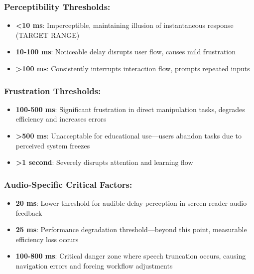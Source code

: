 \subsubsection{Perceptibility Thresholds:}

\begin{itemize}
	\item \textbf{<10 ms}: Imperceptible, maintaining illusion of instantaneous response (TARGET RANGE) \supercite{Nielsen1993UsabilityEngineering}
	\item \textbf{10-100 ms}: Noticeable delay disrupts user flow, causes mild frustration \supercite{Miller1968ReactionTime}
	\item \textbf{>100 ms}: Consistently interrupts interaction flow, prompts repeated inputs \supercite{Shneiderman1998DesigningTheUserInterface}
\end{itemize}


\subsubsection{Frustration Thresholds:}

\begin{itemize}
	\item \textbf{100-500 ms}: Significant frustration in direct manipulation tasks, degrades efficiency and increases errors \supercite{Card1983ThePsychologyOfHumanComputerInteraction}
	\item \textbf{>500 ms}: Unacceptable for educational use—users abandon tasks due to perceived system freezes \supercite{Sears1993TheEffectOfResponseTime}
	\item \textbf{>1 second}: Severely disrupts attention and learning flow \supercite{Dix2004HumanComputerInteraction}
\end{itemize}


\subsubsection{Audio-Specific Critical Factors:}

\begin{itemize}
	\item \textbf{20 ms}: Lower threshold for audible delay perception in screen reader audio feedback \supercite{Grunwald1999AuditoryLatency}
	\item \textbf{25 ms}: Performance degradation threshold—beyond this point, measurable efficiency loss occurs \supercite{Fowler2011ScreenReaderLatency}
	\item \textbf{100-800 ms}: Critical danger zone where speech truncation occurs, causing navigation errors and forcing workflow adjustments \supercite{Bigham2014UnderstandingScreenReaderUsage}
\end{itemize}


